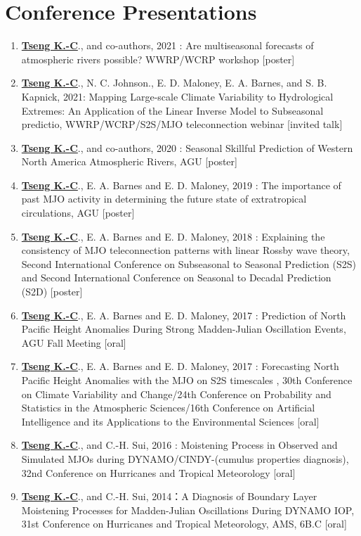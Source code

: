 \documentclass{article}
\begin{document}
\section{\color{airforceblue}Conference Presentations}
\begin{enumerate} 
	\item \normalsize{\bf{\underline{Tseng K.-C}}}., and co-authors, 2021 : Are multiseasonal forecasts of atmospheric rivers possible? WWRP/WCRP workshop [poster]
	\item \normalsize{\bf{\underline{Tseng K.-C}}}., N. C. Johnson., E. D. Maloney, E. A. Barnes, and S. B. Kapnick, 2021: Mapping Large-scale Climate Variability to Hydrological Extremes: An Application of the Linear Inverse Model to Subseasonal predictio, WWRP/WCRP/S2S/MJO teleconnection webinar [invited talk]
	\item \normalsize{\bf{\underline{Tseng K.-C}}}., and co-authors, 2020 : Seasonal Skillful Prediction of Western North America Atmospheric Rivers, AGU [poster]
	\item \normalsize{\bf{\underline{Tseng K.-C}}}., E. A. Barnes and E. D. Maloney, 2019 : The importance of past MJO activity in determining the future state of extratropical circulations, AGU [poster]
	\item \normalsize{\bf{\underline{Tseng K.-C}}}., E. A. Barnes and E. D. Maloney, 2018 : Explaining the consistency of MJO teleconnection patterns with linear Rossby wave theory, Second International Conference on Subseasonal to Seasonal Prediction (S2S) and Second International Conference on Seasonal to Decadal Prediction (S2D) [poster]
	\item \normalsize{\bf{\underline{Tseng K.-C}}}., E. A. Barnes and E. D. Maloney, 2017 : Prediction of North Pacific Height Anomalies During Strong Madden-Julian Oscillation Events, AGU Fall Meeting [oral]
	\item \normalsize{\bf{\underline{Tseng K.-C}}}., E. A. Barnes and E. D. Maloney, 2017 : Forecasting North Pacific Height Anomalies with the MJO on S2S timescales , 30th Conference on Climate Variability and Change/24th Conference on Probability and Statistics in the Atmospheric Sciences/16th Conference on Artificial Intelligence and its Applications to the Environmental Sciences [oral] 
	\item \normalsize{\bf{\underline{Tseng K.-C}}}., and C.-H. Sui, 2016 : Moistening Process in Observed and Simulated MJOs during DYNAMO/CINDY-(cumulus properties diagnosis), 32nd Conference on Hurricanes and Tropical Meteorology [oral] 
	\item \normalsize{\bf{\underline{Tseng K.-C}}}., and C.-H. Sui, 2014：A Diagnosis of Boundary Layer Moistening Processes for Madden-Julian Oscillations During DYNAMO IOP, 31st Conference on Hurricanes and Tropical Meteorology, AMS, 6B.C [oral] 
    \end{enumerate}
\end{document}
